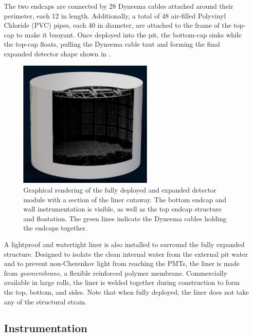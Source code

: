 The two endcaps are connected by 28 Dyneema cables attached around their perimeter, each
\SI{12}{} in length. Additionally, a total of 48 air-filled Polyvinyl Chloride (PVC)
pipes, each \SI{40}{} in diameter, are attached to the frame of the top-cap to make it
buoyant. Once deployed into the pit, the bottom-cap sinks while the top-cap floats, pulling the
Dyneema cable taut and forming the final expanded detector shape shown in
.

\begin{figure} %
    \includegraphics[width=0.6\textwidth]{diagrams/4-chips/chips_render.pdf}
    \caption[Graphical rendering of the \chipsfive detector]
    {Graphical rendering of the fully deployed and expanded \chipsfive detector module with a
        section of the liner cutaway. The bottom endcap and wall instrumentation is visible, as
        well as the top endcap structure and floatation. The green lines indicate the Dyneema
        cables holding the endcaps together.}
    \label{fig:chips_render}
\end{figure}

A lightproof and watertight liner is also installed to surround the fully expanded structure.
Designed to isolate the clean internal water from the external pit water and to prevent
non-Cherenkov light from reaching the PMTs, the liner is made from \emph{geomembrane}, a flexible
reinforced polymer membrane. Commercially available in large rolls, the liner is welded together
during construction to form the top, bottom, and sides. Note that when fully deployed, the liner
does not take any of the structural strain.

\subsection{Instrumentation} %
\label{sec:chips_detector_instrumentation} %

